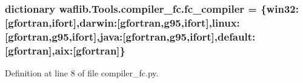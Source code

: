 \subsubsection[{\texorpdfstring{fc\+\_\+compiler}{fc_compiler}}]{\setlength{\rightskip}{0pt plus 5cm}dictionary waflib.\+Tools.\+compiler\+\_\+fc.\+fc\+\_\+compiler = \{\textquotesingle{}win32\textquotesingle{}\+:\mbox{[}\textquotesingle{}gfortran\textquotesingle{},\textquotesingle{}ifort\textquotesingle{}\mbox{]},\textquotesingle{}darwin\textquotesingle{}\+:\mbox{[}\textquotesingle{}gfortran\textquotesingle{},\textquotesingle{}g95\textquotesingle{},\textquotesingle{}ifort\textquotesingle{}\mbox{]},\textquotesingle{}linux\textquotesingle{}\+:\mbox{[}\textquotesingle{}gfortran\textquotesingle{},\textquotesingle{}g95\textquotesingle{},\textquotesingle{}ifort\textquotesingle{}\mbox{]},\textquotesingle{}java\textquotesingle{}\+:\mbox{[}\textquotesingle{}gfortran\textquotesingle{},\textquotesingle{}g95\textquotesingle{},\textquotesingle{}ifort\textquotesingle{}\mbox{]},\textquotesingle{}default\textquotesingle{}\+:\mbox{[}\textquotesingle{}gfortran\textquotesingle{}\mbox{]},\textquotesingle{}aix\textquotesingle{}\+:\mbox{[}\textquotesingle{}gfortran\textquotesingle{}\mbox{]}\}}\hypertarget{namespacewaflib_1_1_tools_1_1compiler__fc_ae999eaabada8cee583eba8010cb109c1}{}\label{namespacewaflib_1_1_tools_1_1compiler__fc_ae999eaabada8cee583eba8010cb109c1}


Definition at line 8 of file compiler\+\_\+fc.\+py.

